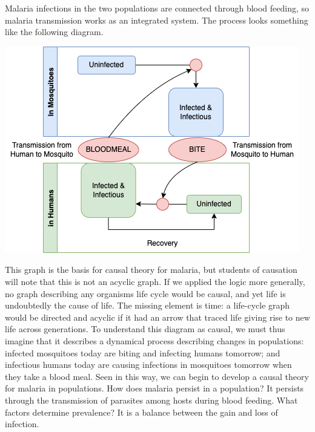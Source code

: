 \documentclass[
]{book}
\begin{document}
Malaria infections in the two populations are connected through blood feeding, so malaria transmission works as an integrated system.
The process looks something like the following diagram.

\includegraphics{Figures/LifeCycleModel.png}

This graph is the basis for causal theory for malaria, but students of causation will note that this is not an acyclic graph.
If we applied the logic more generally, no graph describing any organisms life cycle would be causal, and yet life is undoubtedly the cause of life.
The missing element is time: a life-cycle graph would be directed and acyclic if it had an arrow that traced life giving rise to new life across generations.
To understand this diagram as causal, we must thus imagine that it describes a dynamical process describing changes in populations: infected mosquitoes today are biting and infecting humans tomorrow; and infectious humans today are causing infections in mosquitoes tomorrow when they take a blood meal.
Seen in this way, we can begin to develop a causal theory for malaria in populations.
How does malaria persist in a population?
It persists through the transmission of parasites among hosts during blood feeding.
What factors determine prevalence?
It is a balance between the gain and loss of infection.
\end{document}
